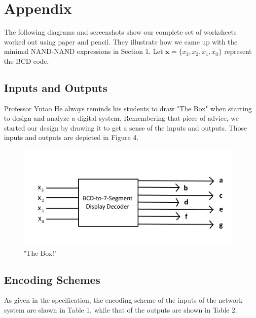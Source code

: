 \documentclass{article}
\renewcommand{\vec}[1]{\mathbf{#1}}
\begin{document}
\section{Appendix}
The following diagrams and screenshots show our complete set of worksheets 
worked out using paper and pencil. They illustrate how we came up with the 
minimal NAND-NAND expressions in Section 1. Let $ \vec{x} = 
\{ x_3, x_2, x_1, x_0 \} $ represent the BCD code.\\


\subsection{Inputs and Outputs}
Professor Yutao He always reminds his students to draw "The Box" when starting 
to design and analyze a digital system. Remembering that piece of advice, we 
started our design by drawing it to get a sense of the inputs and outputs. 
Those inputs and outputs are depicted in Figure 4. \\

\clearpage

\begin{figure}[h!]
\centering
\includegraphics[scale=0.7]{Box}
\caption{"The Box!"}
\end{figure}


\subsection{Encoding Schemes}
As given in the specification, the encoding scheme of the inputs of the 
network system are shown in Table 1, while that of the outputs are shown in 
Table 2.\\
\end{document}
